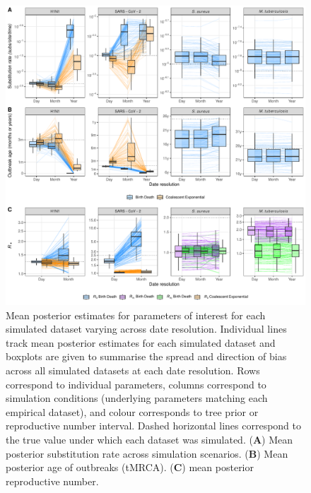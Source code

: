 \documentclass[12pt]{article}
\begin{document}
\begin{spacing}{2}
\begin{figure}[H]
    \centering
    \includegraphics[width=\textwidth]{simulation_parm_panel.pdf}
    \caption{Mean posterior estimates for parameters of interest for each simulated dataset varying across date resolution. Individual lines track mean posterior estimates for each simulated dataset and boxplots are given to summarise the spread and direction of bias across all simulated datasets at each date resolution. Rows correspond to individual parameters, columns correspond to simulation conditions (underlying parameters matching each empirical dataset), and colour corresponds to tree prior or reproductive number interval. Dashed horizontal lines correspond to the true value under which each dataset was simulated. (\textbf{A}) Mean posterior substitution rate across simulation scenarios. (\textbf{B}) Mean posterior age of outbreaks (tMRCA). (\textbf{C}) mean posterior reproductive number. }
    \label{fig:sim-parms}
\end{figure}


\end{spacing}
\end{document}
